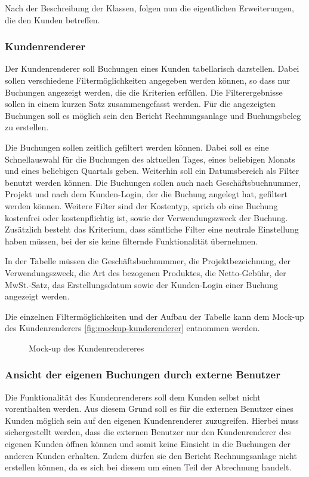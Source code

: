 Nach der Beschreibung der Klassen, folgen nun die eigentlichen Erweiterungen, die den Kunden betreffen.

\subsubsection{Kundenrenderer} \label{subsubsec:kundenrenderer}
Der Kundenrenderer soll Buchungen eines Kunden tabellarisch darstellen.
Dabei sollen verschiedene Filtermöglichkeiten angegeben werden können, so dass nur Buchungen angezeigt werden, die die Kriterien erfüllen.
Die Filterergebnisse sollen in einem kurzen Satz zusammengefasst werden.
Für die angezeigten Buchungen soll es möglich sein den Bericht Rechnungsanlage und Buchungsbeleg zu erstellen.

Die Buchungen sollen zeitlich gefiltert werden können.
Dabei soll es eine Schnellauswahl für die Buchungen des aktuellen Tages, eines beliebigen Monats und eines beliebigen Quartals geben.
Weiterhin soll ein Datumsbereich als Filter benutzt werden können.
Die Buchungen sollen auch nach Geschäftsbuchnummer, Projekt und nach dem Kunden-Login, der die Buchung angelegt hat, gefiltert werden können.
Weitere Filter sind der Kostentyp, sprich ob eine Buchung kostenfrei oder kostenpflichtig ist, sowie der Verwendungszweck der Buchung.
Zusätzlich besteht das Kriterium, dass sämtliche Filter eine neutrale Einstellung haben müssen, bei der sie keine filternde Funktionalität übernehmen.

In der Tabelle müssen die Geschäftsbuchnummer, die Projektbezeichnung, der Verwendungszweck, die Art des bezogenen Produktes, die Netto-Gebühr, der MwSt.-Satz, das Erstellungsdatum sowie der Kunden-Login einer Buchung angezeigt werden.

Die einzelnen Filtermöglichkeiten und der Aufbau der Tabelle kann dem Mock-up des Kundenrenderers \vref{fig:mockup-kunderenderer} entnommen werden.

\begin{figure}[htb]
	\centering
	\caption{Mock-up des Kundenrendereres}
	\label{fig:mockup-kunderenderer}
\end{figure}

\subsubsection{Ansicht der eigenen Buchungen durch externe Benutzer} \label{subsubsec:ansicht_externe_benutzer}
Die Funktionalität des Kundenrenderers soll dem Kunden selbst nicht vorenthalten werden.
Aus diesem Grund soll es für die externen Benutzer eines Kunden möglich sein auf den eigenen Kundenrenderer zuzugreifen.
Hierbei muss sichergestellt werden, dass die externen Benutzer nur den Kundenrenderer des eigenen Kunden öffnen können und somit keine Einsicht in die Buchungen der anderen Kunden erhalten. 
Zudem dürfen sie den Bericht Rechnungsanlage nicht erstellen können, da es sich bei diesem um einen Teil der Abrechnung handelt.

